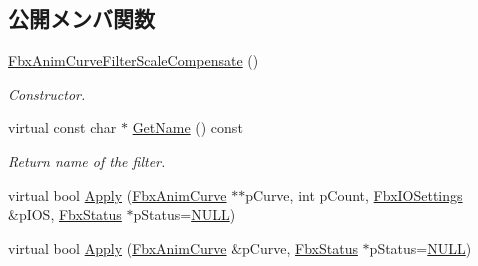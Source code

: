 \subsection*{公開メンバ関数}
\begin{DoxyCompactItemize}
\item 
\hyperlink{class_fbx_anim_curve_filter_scale_compensate_a4927bdefc9eea75da7461f4a9a7f418c}{Fbx\+Anim\+Curve\+Filter\+Scale\+Compensate} ()
\begin{DoxyCompactList}\small\item\em Constructor. \end{DoxyCompactList}\item 
virtual const char $\ast$ \hyperlink{class_fbx_anim_curve_filter_scale_compensate_af6564ed47826563b148a2c41901e4f03}{Get\+Name} () const
\begin{DoxyCompactList}\small\item\em Return name of the filter. \end{DoxyCompactList}\item 
virtual bool \hyperlink{class_fbx_anim_curve_filter_scale_compensate_a0b9bf864fac2179f7172d737929cbdb6}{Apply} (\hyperlink{class_fbx_anim_curve}{Fbx\+Anim\+Curve} $\ast$$\ast$p\+Curve, int p\+Count, \hyperlink{class_fbx_i_o_settings}{Fbx\+I\+O\+Settings} \&p\+I\+OS, \hyperlink{class_fbx_status}{Fbx\+Status} $\ast$p\+Status=\hyperlink{fbxarch_8h_a070d2ce7b6bb7e5c05602aa8c308d0c4}{N\+U\+LL})
\item 
virtual bool \hyperlink{class_fbx_anim_curve_filter_scale_compensate_ae1cb78bcd44d445bb5d8b9bd2aaa3142}{Apply} (\hyperlink{class_fbx_anim_curve}{Fbx\+Anim\+Curve} \&p\+Curve, \hyperlink{class_fbx_status}{Fbx\+Status} $\ast$p\+Status=\hyperlink{fbxarch_8h_a070d2ce7b6bb7e5c05602aa8c308d0c4}{N\+U\+LL})
\end{DoxyCompactItemize}
